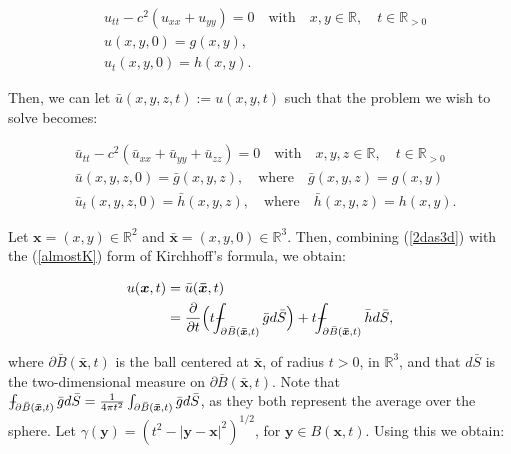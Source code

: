 \documentclass[a4paper, 12pt]{article}
\def\Xint#1{\mathchoice
{\XXint\displaystyle\textstyle{#1}}%
{\XXint\textstyle\scriptstyle{#1}}%
{\XXint\scriptstyle\scriptscriptstyle{#1}}%
{\XXint\scriptscriptstyle\scriptscriptstyle{#1}}%
\!\int}
\def\XXint#1#2#3{{\setbox0=\hbox{$#1{#2#3}{\int}$ }
\vcenter{\hbox{$#2#3$ }}\kern-.6\wd0}}
\def\dashint{\Xint-}
\numberwithin{equation}{section}
\begin{document}
\begin{equation} \label{2d}
    \begin{aligned}
        &u_{tt}-c^2(u_{xx}+u_{yy})=0 \quad \textrm{with} \quad x,y \in \mathbb{R}, \quad t\in \mathbb{R}_{>0}\\
        &u(x, y, 0)=g(x,y),\\
        &u_t(x,y,0)=h(x,y).
    \end{aligned}
\end{equation}

Then, we can let $\bar{u}(x, y, z, t):=u(x, y, t)$ such that the problem we wish to solve becomes:

\begin{equation} \label{2das3d}
    \begin{aligned}
        &\bar{u}_{tt}-c^2(\bar{u}_{xx}+\bar{u}_{yy}+\bar{u}_{zz})=0 \quad \textrm{with} \quad x,y,z \in \mathbb{R}, \quad t\in \mathbb{R}_{>0}\\
        &\bar{u}(x, y, z, 0)=\bar{g}(x,y,z), \quad \textrm{where} \quad \bar{g}(x,y,z)=g(x,y)\\
        &\bar{u}_t(x,y,z,0)=\bar{h}(x,y,z), \quad \textrm{where} \quad \bar{h}(x,y,z)=h(x,y).
    \end{aligned}
\end{equation}

Let $\boldsymbol{x}=(x,y)\in \mathbb{R}^2$ and $\boldsymbol{\bar{x}}=(x,y, 0)\in \mathbb{R}^3$. Then, combining (\ref{2das3d}) with the (\ref{almostK}) form of Kirchhoff's formula, we obtain:

\begin{equation} \label{star}
    \begin{aligned}
        u(\boldsymbol{x},t)&=\bar{u}(\boldsymbol{\bar{x}}, t)\\
        &=\diffp[1]{}{t}\Big(t\dashint_{\partial \bar{B}(\boldsymbol{\bar{x}}, t)} \bar{g} d\bar{S}\Big)+t \dashint_{\partial \bar{B}(\boldsymbol{\bar{x}}, t)} \bar{h}d\bar{S},
    \end{aligned}
\end{equation}

where $\partial\bar{B}(\boldsymbol{\bar{x}},t)$ is the ball centered at $\boldsymbol{\bar{x}}$, of radius $t>0$, in $\mathbb{R}^3$, and that $d\bar{S}$ is the two-dimensional measure on 
$\partial\bar{B}(\boldsymbol{\bar{x}},t)$. Note that $\dashint_{\partial \bar{B}(\boldsymbol{\bar{x}}, t)} \bar{g} d\bar{S}=\frac{1}{4\pi t^2}\int_{\partial \bar{B}(\boldsymbol{\bar{x}}, t)}\bar{g} d\bar{S}$, as they
both represent the average over the sphere. Let $\gamma (\boldsymbol{y})=(t^2-|\boldsymbol{y}-\boldsymbol{x}|^2)^{1/2}$, for $\boldsymbol{y} \in B(\boldsymbol{x}, t)$. Using 
this we obtain:
\end{document}
